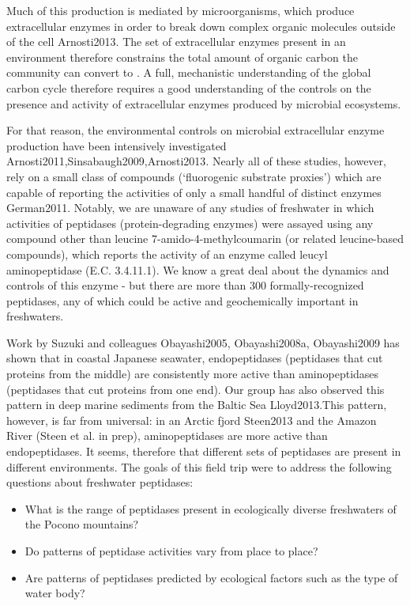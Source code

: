 \documentclass{article}
\begin{document}
    Much of this  production is mediated by microorganisms, which produce extracellular enzymes in order to break down complex organic molecules outside of the cell {Arnosti2013}. The set of extracellular enzymes present in an environment therefore constrains the total amount of organic carbon the community can convert to . A full, mechanistic understanding of the global carbon cycle therefore requires a good understanding of the controls on the presence and activity of extracellular enzymes produced by microbial ecosystems.
    
    For that reason, the environmental controls on microbial extracellular enzyme production have been intensively investigated {Arnosti2011,Sinsabaugh2009,Arnosti2013}. Nearly all of these studies, however, rely on a small class of compounds (`fluorogenic substrate proxies') which are capable of reporting the activities of only a small handful of distinct enzymes {German2011}. Notably, we are unaware of any studies of freshwater in which activities of peptidases (protein-degrading enzymes) were assayed using any compound other than leucine 7-amido-4-methylcoumarin (or related leucine-based compounds), which reports the activity of an enzyme called leucyl aminopeptidase (E.C. 3.4.11.1). We know a great deal about the dynamics and controls of this enzyme - but there are more than 300 formally-recognized peptidases, any of which could be active and geochemically important in freshwaters. 
    
    Work by Suzuki and colleagues {Obayashi2005, Obayashi2008a, Obayashi2009} has shown that in coastal Japanese seawater, endopeptidases (peptidases that cut proteins from the middle) are consistently more active than aminopeptidases (peptidases that cut proteins from one end). Our group has also observed this pattern in deep marine sediments from the Baltic Sea {Lloyd2013}.This pattern, however, is far from universal: in an Arctic fjord {Steen2013} and the Amazon River (Steen et al. in prep), aminopeptidases are more active than endopeptidases. It seems, therefore that different sets of peptidases are present in different environments. The goals of this field trip were to address the following questions about freshwater peptidases:
    \begin{itemize}
      \item What is the range of peptidases present in ecologically diverse freshwaters of the Pocono mountains?
      \item Do patterns of peptidase activities vary from place to place?
      \item Are patterns of peptidases predicted by ecological factors such as the type of water body?
    \end{itemize}
    
\end{document}
